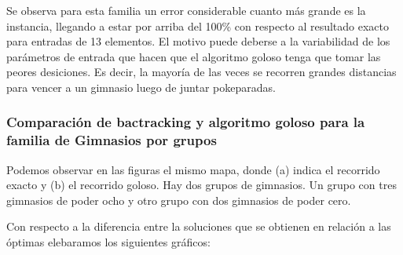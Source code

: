 Se observa para esta familia un error considerable cuanto más grande es la instancia, llegando a estar por arriba del 100\% con respecto al resultado exacto para entradas de 13 elementos. El motivo puede deberse a la variabilidad de los parámetros de entrada que hacen que el algoritmo goloso tenga que tomar las peores desiciones. Es decir, la mayoría de las veces se recorren grandes distancias para vencer a un gimnasio luego de juntar pokeparadas.

\subsubsection*{Comparación de bactracking y algoritmo goloso para la familia de Gimnasios por grupos} 

Podemos observar en las figuras el mismo mapa, donde (a) indica el recorrido exacto y (b) el recorrido goloso. Hay dos grupos de gimnasios. Un grupo con tres gimnasios de poder ocho y otro grupo con dos gimnasios de poder cero.

Con respecto a la diferencia entre la soluciones que se obtienen en relaci\'on a las \'optimas elebaramos los siguientes gráficos:\\

   \begin{figure}[h]
 \centering
       \label{fig:randomexacto}
    \label{fig:randomgoloso}
    \end{figure}

